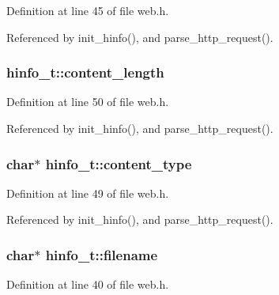 Definition at line 45 of file web.\+h.



Referenced by init\+\_\+hinfo(), and parse\+\_\+http\+\_\+request().

\subsubsection[{\texorpdfstring{content\+\_\+length}{content_length}}]{ hinfo\+\_\+t\+::content\+\_\+length}\hypertarget{structhinfo__t_a6cf5714c0fe8e8e7f7819194274f9052}{}\label{structhinfo__t_a6cf5714c0fe8e8e7f7819194274f9052}


Definition at line 50 of file web.\+h.



Referenced by init\+\_\+hinfo(), and parse\+\_\+http\+\_\+request().

\subsubsection[{\texorpdfstring{content\+\_\+type}{content_type}}]{\setlength{\rightskip}{0pt plus 5cm}char$\ast$ hinfo\+\_\+t\+::content\+\_\+type}\hypertarget{structhinfo__t_a87bad5ce6af7ed3613a61d01aef94d8d}{}\label{structhinfo__t_a87bad5ce6af7ed3613a61d01aef94d8d}


Definition at line 49 of file web.\+h.



Referenced by init\+\_\+hinfo(), and parse\+\_\+http\+\_\+request().

\subsubsection[{\texorpdfstring{filename}{filename}}]{\setlength{\rightskip}{0pt plus 5cm}char$\ast$ hinfo\+\_\+t\+::filename}\hypertarget{structhinfo__t_a874ffdf5ade4e3844d7719444495e89c}{}\label{structhinfo__t_a874ffdf5ade4e3844d7719444495e89c}


Definition at line 40 of file web.\+h.



